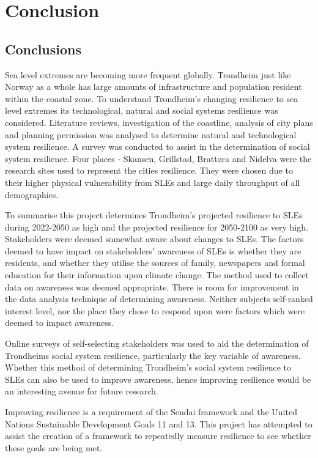 

\chapter{Conclusion}
\section{Conclusions}
Sea level extremes are becoming more frequent globally. Trondheim just like Norway as a whole has large amounts of infrastructure and population resident within the coastal zone. To understand Trondheim's changing resilience to sea level extremes its technological, natural and social systems resilience was considered. Literature reviews, investigation of the coastline, analysis of city plans and planning permission was analysed to determine natural and technological system resilience. A survey was conducted to assist in the determination of social system resilience. Four places - Skansen, Grillstad, Brattøra and Nidelva were the research sites used to represent the cities resilience. They were chosen due to their higher physical vulnerability from SLEs and large daily throughput of all demographics.



To summarise this project determines Trondheim's projected resilience to SLEs during 2022-2050 as high and the projected resilience for 2050-2100 as very high. Stakeholders were deemed somewhat aware about changes to SLEs. The factors deemed to have impact on stakeholders' awareness of SLEs is whether they are residents, and whether they utilise the sources of family, newspapers and formal education for their information upon climate change. The method used to collect data on awareness was deemed appropriate. There is room for improvement in the data analysis technique of determining awareness. Neither subjects self-ranked interest level, nor the place they chose to respond upon were factors which were deemed to impact awareness.

Online surveys of self-selecting stakeholders was used to aid the determination of Trondheims social system resilience, particularly the key variable of awareness.
Whether this method of determining Trondheim's social system resilience to SLEs can also be used to improve awareness, hence improving resilience would be an interesting avenue for future research. 

Improving resilience is a requirement of the Sendai framework and the United Nations Sustainable Development Goals 11 and 13. This project has attempted to assist the creation of a framework to repeatedly measure resilience to see whether these goals are being met.